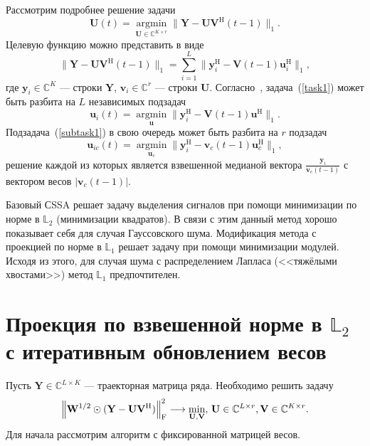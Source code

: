 \documentclass[specialist,
               substylefile = spbu.rtx,
               subf,href,colorlinks=true, 12pt]{disser}
\DeclareMathOperator*{\argmin}{argmin}
\begin{document}
Рассмотрим подробнее решение задачи
\begin{equation}\label{task1}
	\mathbf{U}(t) = \argmin\limits_{\mathbf{U}\in \mathbb{C}^{K\times r}} \|\mathbf{Y}-\mathbf{U}\mathbf{V}^{\mathrm{H}}(t-1)\|_1.
\end{equation}
Целевую функцию можно представить в виде $$\|\mathbf{Y}-\mathbf{U}\mathbf{V}^{\mathrm{H}}(t-1)\|_1 = \sum\limits_{i=1}^{L} \|\mathbf{y}_i^{\mathrm{H}}-\mathbf{V}(t-1)\mathbf{u}^{\mathrm{H}}_i \|_1, $$ где $\mathbf{y}_i\in \mathbb{C}^K$ --- строки $\mathbf{Y}$, $\mathbf{v}_i\in\mathbb{C}^r$ --- строки $\mathbf{U}$.
Согласно~\cite{KeKanade}, задача~(\ref{task1}) может быть разбита на $L$ независимых подзадач
\begin{equation}\label{subtask1}
	\mathbf{u}_i(t) = \argmin\limits_{\mathbf{u}}\|\mathbf{y}_i^{\mathrm{H}}-\mathbf{V}(t-1)\mathbf{u}^{\mathrm{H}} \|_1.
\end{equation}
 Подзадача~(\ref{subtask1}) в свою очередь может быть разбита на $r$ подзадач
\begin{equation}\label{subtask1}
	\mathbf{u}_{ic}(t) = \argmin\limits_{\mathbf{u}_c}\|\mathbf{y}_{i}^{\mathrm{H}}-\mathbf{v}_c(t-1)\mathbf{u}_c^{\mathrm{H}} \|_1,
\end{equation}
решение каждой из которых является взвешенной медианой вектора $\frac{\mathbf{y}_i}{\mathbf{v}_c(t-1)}$ с вектором весов $|\mathbf{v}_c(t-1)|$.

Базовый СSSA решает задачу выделения сигналов при помощи минимизации по норме в $\mathbb{L}_2$ (минимизации квадратов). В связи с этим данный метод хорошо показывает себя для случая Гауссовского шума. Модификация метода с проекцией по норме в $\mathbb{L}_1$ решает задачу при помощи минимизации модулей. Исходя из этого, для случая шума с распределением Лапласа (<<тяжёлыми хвостами>>) метод $\mathbb{L}_1$ предпочтителен.

\section{Проекция по взвешенной норме в $\mathbb{L}_2$ с итеративным обновлением весов}

Пусть $\mathbf{Y} \in \mathbb{C}^{L\times K}$ --- траекторная матрица ряда.
Необходимо решить задачу
\begin{equation*}
		\norm{\mathbf{W}^{1/2}\odot(\mathbf{Y}-\mathbf{U}\mathbf{V}^{\mathrm{H}})}^2_\mathrm{F} \longrightarrow \min_{\mathbf{U},\mathbf{V}}, \, \mathbf{U} \in \mathbb{C}^{L\times r}, \mathbf{V} \in \mathbb{C}^{K\times r}.
\end{equation*}
Для начала рассмотрим алгоритм с фиксированной матрицей весов.
\end{document}
